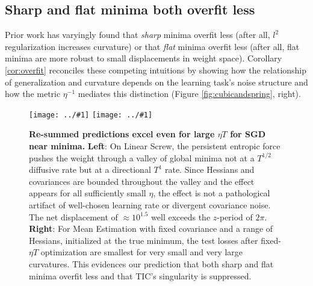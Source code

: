 \documentclass{article}
\theoremstyle{plain}
\theoremstyle{definition}
\newcommand{\plotmoow}[3]{\texttt{[image: ../\#1]}}
\begin{document}

    \subsection{Sharp and flat minima both overfit less} \label{subsect:overfit}
        Prior work has varyingly found that \emph{sharp} minima overfit less
        (after all, $l^2$ regularization increases curvature) or that
        \emph{flat} minima overfit less (after all, flat minima are more
        robust to small displacements in weight space).  Corollary
        \ref{cor:overfit} reconciles these competing intuitions by showing
        how the relationship of generalization and curvature depends on the
        learning task's noise structure and how the metric $\eta^{-1}$ mediates
        this distinction
        (Figure \ref{fig:cubicandspring}, right).
        
        \begin{figure}[h!] 
            \centering
            \plotmoow{plots/new-thermo-linear-screw}{0.48\columnwidth}{4.0cm}
            \plotmoow{plots/new-tak}{0.48\columnwidth}{4.0cm}
            \caption{
                {\bf Re-summed predictions excel even for large $\eta T$ for
                SGD near minima.}
                {\bf Left}: On Linear Screw, the persistent entropic force
                pushes the weight through a valley of global minima not at a
                $T^{1/2}$ diffusive rate but at a directional $T^1$ rate.
                Since Hessians and covariances are bounded throughout
                the valley and the effect appears for all sufficiently small
                $\eta$, the effect is not a pathological artifact of
                well-chosen learning rate or divergent covariance noise.  The
                net displacement of $\approx 10^{1.5}$ well exceeds the
                $z$-period of $2\pi$. 
                {\bf Right}: For Mean Estimation with fixed covariance and a
                range of Hessians, initialized at the true minimum, the test
                losses after fixed-$\eta T$ optimization are smallest for very
                small and very large curvatures.  This evidences our prediction
                that both sharp and flat minima overfit less and that TIC's
                singularity is suppressed.
            }
            \label{fig:thermoandtak}
        \end{figure}
\end{document}
